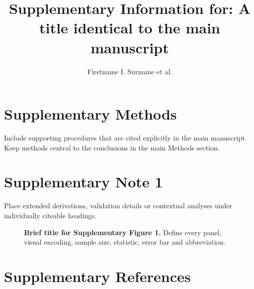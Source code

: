 \documentclass[11pt,a4paper]{article}
\title{Supplementary Information for: A title identical to the main manuscript}
\author{Firstname I. Surname et al.}
\date{}
\begin{document}
\maketitle

\section*{Supplementary Methods}
Include supporting procedures that are cited explicitly in the main manuscript. Keep methods central to the conclusions in the main Methods section.

\section*{Supplementary Note 1}
Place extended derivations, validation details or contextual analyses under individually citeable headings.

\begin{figure}[htbp]
  \centering
  \caption{\textbf{Brief title for Supplementary Figure 1.} Define every panel, visual encoding, sample size, statistic, error bar and abbreviation.}
  \label{fig:supplementary1}
\end{figure}

\section*{Supplementary References}


\end{document}

